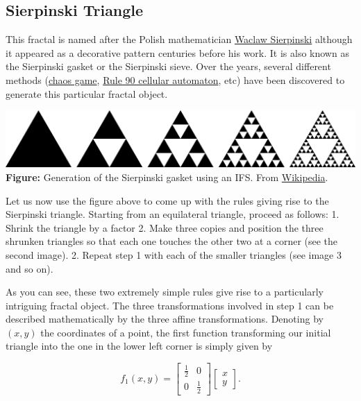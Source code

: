 \documentclass[11pt]{article}
\makeatletter
\def\maxwidth{\ifdim\Gin@nat@width>\linewidth\linewidth
    \else\Gin@nat@width\fi}
\let\Oldincludegraphics\includegraphics
\renewcommand{\includegraphics}[1]{\Oldincludegraphics[width=.8\maxwidth]{#1}}
\makeatother
\begin{document}
\hypertarget{sierpinski-triangle}{%
\subsection{Sierpinski Triangle}\label{sierpinski-triangle}}

This fractal is named after the Polish mathematician
\href{https://en.wikipedia.org/wiki/Wac\%C5\%82aw_Sierpi\%C5\%84ski}{Waclaw
Sierpinski} although it appeared as a decorative pattern centuries
before his work. It is also known as the Sierpinski gasket or the
Sierpinski sieve. Over the years, several different methods
(\href{https://en.wikipedia.org/wiki/Chaos_game}{chaos game},
\href{https://en.wikipedia.org/wiki/Rule_90}{Rule 90 cellular
automaton}, etc) have been discovered to generate this particular
fractal object.

\includegraphics{Sierpinski_triangle_evolution.png} \textbf{Figure:}
Generation of the Sierpinski gasket using an IFS. From
\href{https://en.wikipedia.org/wiki/Sierpinski_triangle}{Wikipedia}.

Let us now use the figure above to come up with the rules giving rise to
the Sierpinski triangle. Starting from an equilateral triangle, proceed
as follows: 1. Shrink the triangle by a factor 2. Make three copies and
position the three shrunken triangles so that each one touches the other
two at a corner (see the second image). 2. Repeat step 1 with each of
the smaller triangles (see image 3 and so on).

As you can see, these two extremely simple rules give rise to a
particularly intriguing fractal object. The three transformations
involved in step 1 can be described mathematically by the three affine
transformations. Denoting by \((x, y)\) the coordinates of a point, the
first function transforming our initial triangle into the one in the
lower left corner is simply given by

\[
    f_1(x, y) =  \begin{bmatrix} \frac{1}{2} & 0 \\ 0 & \frac{1}{2} \end{bmatrix} \begin{bmatrix} x \\ y \end{bmatrix}.
\]
\end{document}
